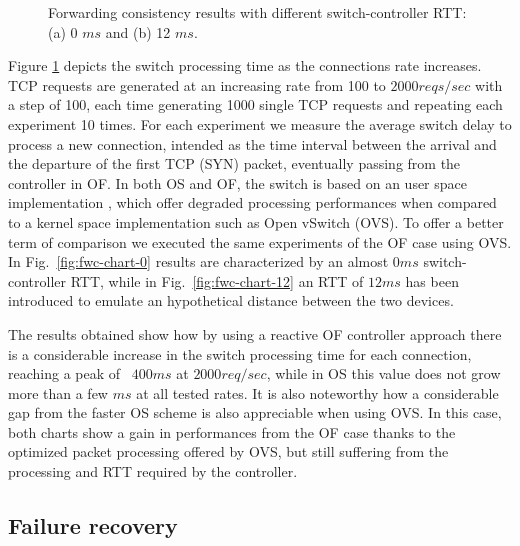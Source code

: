 \documentclass[10pt,conference]{IEEEtran}
\begin{document}
\begin{figure}
{{
     }
     \label{fig:fwc-chart-12}}
  \caption{Forwarding consistency results with different switch-controller RTT: (a) 0 $ms$  and (b) 12 $ms$.}
  \label{fig:fwc-charts}\end{figure} 
Figure \ref{fig:fwc-charts} depicts the switch processing time as the connections rate increases. TCP requests are generated at an increasing rate from 100 to $2000reqs/sec$ with a step of 100, each time generating 1000 single TCP requests and repeating each experiment 10 times. For each experiment we measure the average switch delay to process a new connection, intended as the time interval between the arrival and the departure of the first TCP (SYN) packet, eventually passing from the controller in OF. In both OS and OF, the switch is based on an user space implementation \cite{ofsoftswitch13}, which offer degraded processing performances when compared to a kernel space implementation such as Open vSwitch (OVS). To offer a better term of comparison we executed the same experiments of the OF case using OVS. In Fig.~\ref{fig:fwc-chart-0} results are characterized by an almost $0ms$ switch-controller RTT, while in Fig.~\ref{fig:fwc-chart-12} an RTT of $12ms$ has been introduced to emulate an hypothetical distance between the two devices.

The results obtained show how by using a reactive OF controller approach there is a considerable increase in the switch processing time for each connection, reaching a peak of ~$400ms$ at $2000req/sec$, while in OS this value does not grow more than a few $ms$ at all tested rates. It is also noteworthy how a considerable gap from the faster OS scheme is also appreciable when using OVS. In this case, both charts show a gain in performances from the OF case thanks to the optimized packet processing offered by OVS, but still suffering from the processing and RTT required by the controller. 

\subsection{Failure recovery}
\end{document}
